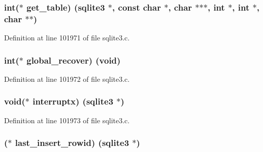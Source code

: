 \subsubsection[{get\+\_\+table}]{\setlength{\rightskip}{0pt plus 5cm}int($\ast$ get\+\_\+table) ({\bf sqlite3} $\ast$, const char $\ast$, char $\ast$$\ast$$\ast$, int $\ast$, int $\ast$, char $\ast$$\ast$)}\label{structsqlite3__api__routines_a06283d641523bfc7591489d1e52029ac}


Definition at line 101971 of file sqlite3.\+c.

\hypertarget{structsqlite3__api__routines_a854a8b54dbe2dd948fe7af169b06cd23}{}
\subsubsection[{global\+\_\+recover}]{\setlength{\rightskip}{0pt plus 5cm}int($\ast$ global\+\_\+recover) (void)}\label{structsqlite3__api__routines_a854a8b54dbe2dd948fe7af169b06cd23}


Definition at line 101972 of file sqlite3.\+c.

\hypertarget{structsqlite3__api__routines_ad5f1fb9f2b2fcb656a7e850cbc276cb1}{}
\subsubsection[{interruptx}]{\setlength{\rightskip}{0pt plus 5cm}void($\ast$ interruptx) ({\bf sqlite3} $\ast$)}\label{structsqlite3__api__routines_ad5f1fb9f2b2fcb656a7e850cbc276cb1}


Definition at line 101973 of file sqlite3.\+c.

\hypertarget{structsqlite3__api__routines_a03d51b30a03196c58fd61b31cb1d471f}{}
\subsubsection[{last\+\_\+insert\+\_\+rowid}]{($\ast$ last\+\_\+insert\+\_\+rowid) ({\bf sqlite3} $\ast$)}\label{structsqlite3__api__routines_a03d51b30a03196c58fd61b31cb1d471f}


